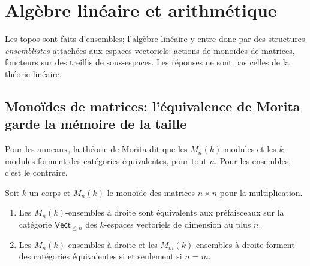 \section{Algèbre linéaire et arithmétique}\label{sec:linear}

Les topos sont faits d'ensembles; l'algèbre linéaire y entre donc par des structures \emph{ensemblistes} attachées aux espaces vectoriels: actions de monoïdes de matrices, foncteurs sur des treillis de sous-espaces. Les réponses ne sont pas celles de la théorie linéaire.

\subsection{Monoïdes de matrices: l'équivalence de Morita garde la mémoire de la taille}

Pour les anneaux, la théorie de Morita dit que les $M_n(k)$-modules et les $k$-modules forment des catégories équivalentes, pour tout $n$. Pour les ensembles, c'est le contraire.

\begin{theorem}\label{th:matrixmorita}
Soit $k$ un corps et $M_n(k)$ le monoïde des matrices $n\times n$ pour la multiplication.
\begin{enumerate}
\item Les $M_n(k)$-ensembles à droite sont équivalents aux préfaisceaux sur la catégorie $\mathsf{Vect}_{\le n}$ des $k$-espaces vectoriels de dimension au plus $n$.
\item Les $M_n(k)$-ensembles à droite et les $M_m(k)$-ensembles à droite forment des catégories équivalentes si et seulement si $n = m$.
\end{enumerate}
\end{theorem}

